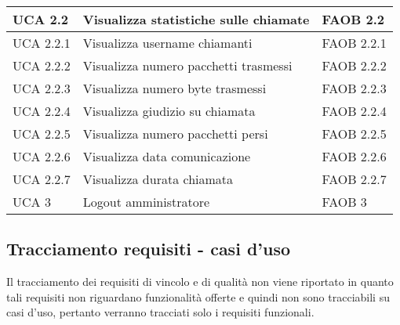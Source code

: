 \begin{longtable}{p{} p{} p{} }
\midrule
UCA 2.2 & Visualizza statistiche sulle chiamate & FAOB 2.2\\

\midrule
UCA 2.2.1 & Visualizza username chiamanti & FAOB 2.2.1\\
\midrule
UCA 2.2.2 & Visualizza numero pacchetti trasmessi & FAOB 2.2.2\\
\midrule
UCA 2.2.3 & Visualizza numero byte trasmessi & FAOB 2.2.3\\
\midrule
UCA 2.2.4 & Visualizza giudizio su chiamata & FAOB 2.2.4\\
\midrule
UCA 2.2.5 & Visualizza numero pacchetti persi & FAOB 2.2.5\\
\midrule
UCA 2.2.6 & Visualizza data comunicazione & FAOB 2.2.6\\
\midrule
UCA 2.2.7 & Visualizza durata chiamata & FAOB 2.2.7\\


\midrule
UCA 3 & Logout amministratore & FAOB 3\\

\end{longtable}

\newpage

\subsection{Tracciamento requisiti - casi d'uso}
Il tracciamento dei requisiti di vincolo e di qualità non viene riportato in quanto tali requisiti non riguardano funzionalità offerte e quindi non sono tracciabili su casi d’uso, pertanto verranno tracciati solo i requisiti funzionali.
